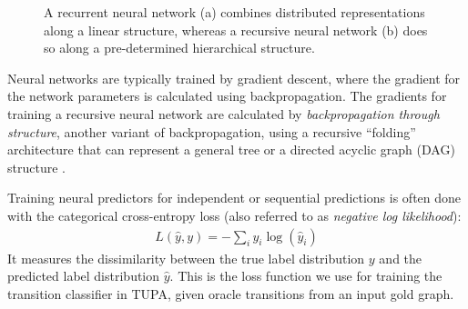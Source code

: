 \documentclass[12pt,a4paper,table]{report}
\renewcommand\cite{\citep}      %
\begin{document}
\begin{figure}[ht!]\small
  \begin{subfigure}{\textwidth}
  \parbox{.2\textwidth}{\caption{}\label{fig:rnn}}
  \parbox{.8\textwidth}{
  \centering
  }
  \end{subfigure}
  \begin{subfigure}{\textwidth}
  \parbox{.2\textwidth}{\caption{}\label{fig:recnn}}
  \parbox{.8\textwidth}{
  \centering
  }
  \end{subfigure}
  \caption{\label{fig:nns}
    A recurrent neural network (a) combines distributed representations along a
    linear structure, whereas a recursive neural network (b) does so along a
    pre-determined hierarchical structure.
  }
\end{figure}
Neural networks are typically trained by gradient descent, where the gradient for the network parameters
is calculated using backpropagation.
The gradients for training a recursive neural network are calculated by \textit{backpropagation
through structure}, another variant of backpropagation, using a recursive
``folding'' architecture that can represent a general tree or a directed acyclic
graph (DAG) structure \cite{goller1996learning}.

Training neural predictors for independent or sequential predictions is often done
with the categorical cross-entropy loss (also referred to as \emph{negative log
likelihood}):
\begin{align*}
    L(\hat{y},y) = -\sum_i y_i\log(\hat{y}_i)
\end{align*}
It measures the dissimilarity between the true label distribution
$y$ and the predicted label distribution $\hat{y}$.
This is the loss function we use for training the transition classifier in TUPA,
given oracle transitions from an input gold graph.
\end{document}
